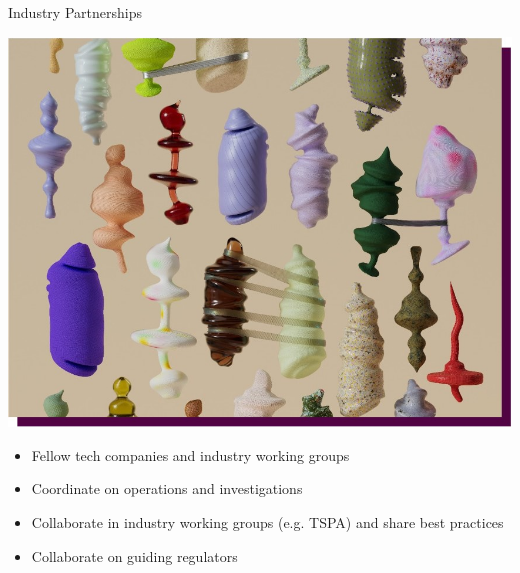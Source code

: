 \documentclass[nobackground,dvipsnames,table]{beamer}
\begin{document}
\begin{frame}{Industry Partnerships}

\includegraphics[width=.5\textwidth]{img/fig14.jpg}
\hfill
\begin{minipage}[b]{0.48\textwidth}
    \small{
        \begin{itemize} 
            \item Fellow tech companies and industry working groups
            \item Coordinate on operations and investigations
            \item Collaborate in industry working groups (e.g. TSPA) and share best practices
            \item Collaborate on guiding regulators
        \end{itemize}
    }
\end{minipage}

\end{frame}
\end{document}
